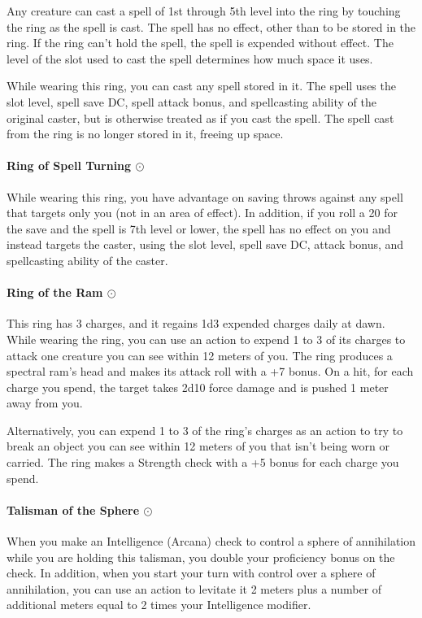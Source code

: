         Any creature can cast a spell of 1st through 5th level into the ring by touching the ring as the spell is cast.
        The spell has no effect, other than to be stored in the ring.
        If the ring can't hold the spell, the spell is expended without effect.
        The level of the slot used to cast the spell determines how much space it uses.

        While wearing this ring, you can cast any spell stored in it.
        The spell uses the slot level, spell save DC, spell attack bonus, and spellcasting ability of the original caster, but is otherwise treated as if you cast the spell.
        The spell cast from the ring is no longer stored in it, freeing up space.
    \paragraph{Ring of Spell Turning $\odot$}
        While wearing this ring, you have advantage on saving throws against any spell that targets only you (not in an area of effect).
        In addition, if you roll a 20 for the save and the spell is 7th level or lower, the spell has no effect on you and instead targets the caster, using the slot level, spell save DC, attack bonus, and spellcasting ability of the caster.
    \paragraph{Ring of the Ram $\odot$}
        This ring has 3 charges, and it regains 1d3 expended charges daily at dawn.
        While wearing the ring, you can use an action to expend 1 to 3 of its charges to attack one creature you can see within 12 meters of you.
        The ring produces a spectral ram's head and makes its attack roll with a +7 bonus.
        On a hit, for each charge you spend, the target takes 2d10 force damage and is pushed 1 meter away from you.

        Alternatively, you can expend 1 to 3 of the ring's charges as an action to try to break an object you can see within 12 meters of you that isn't being worn or carried.
        The ring makes a Strength check with a +5 bonus for each charge you spend.
    \paragraph{Talisman of the Sphere $\odot$}
        When you make an Intelligence (Arcana) check to control a sphere of annihilation while you are holding this talisman, you double your proficiency bonus on the check.
        In addition, when you start your turn with control over a sphere of annihilation, you can use an action to levitate it 2 meters plus a number of additional meters equal to 2 times your Intelligence modifier.
